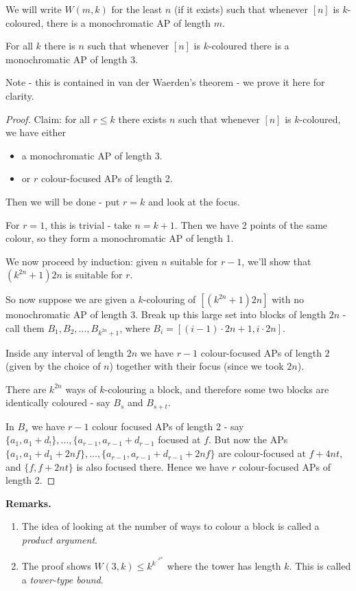 \documentclass[10pt,a4paper]{article}
\begin{document}
We will write $W(m,k)$ for the least $n$ (if it exists) such that whenever $[n]$ is $k$-coloured, there is a monochromatic AP of length $m$.
\begin{proposition}
  For all $k$ there is $n$ such that whenever $[n]$ is $k$-coloured there is a monochromatic AP of length 3.
\end{proposition}
Note - this is contained in van der Waerden's theorem - we prove it here for clarity.
\begin{proof}
  Claim: for all $r \leq k$ there exists $n$ such that whenever $[n]$ is $k$-coloured, we have either
  \begin{itemize}
    \item a monochromatic AP of length 3.
    \item or $r$ colour-focused APs of length 2.
  \end{itemize}
  Then we will be done - put $r = k$ and look at the focus.

  For $r = 1$, this is trivial - take $n=k+1$. Then we have 2 points of the same colour, so they form a monochromatic AP of length 1.

  We now proceed by induction: given $n$ suitable for $r-1$, we'll show that $(k^{2n}+1)2n$ is suitable for $r$.

  So now suppose we are given a $k$-colouring of $[(k^{2n}+1)2n]$ with no monochromatic AP of length 3. Break up this large set into blocks of length $2n$ - call them $B_1, B_2, \ldots, B_{k^{2n}+1}$, where $B_i = [(i-1)\cdot 2n+1, i\cdot 2n]$.

  Inside any interval of length $2n$ we have $r-1$ colour-focused APs of length $2$ (given by the choice of $n$) together with their focus (since we took $2n$).

  There are $k^{2n}$ ways of $k$-colouring a block, and therefore some two blocks are identically coloured - say $B_s$ and $B_{s+t}$.

  In $B_s$ we have $r-1$ colour focused APs of length 2 - say $\{a_1, a_1+d_!\}, \ldots, \{a_{r-1}, a_{r-1}+d_{r-1}$ focused at $f$. But now the APs $\{a_1, a_1+d_1+2nf\}, \ldots, \{a_{r-1}, a_{r-1}+d_{r-1}+2nf\}$ are colour-focused at $f+4nt$, and $\{f, f+2nt\}$ is also focused there. Hence we have $r$ colour-focused APs of length 2.
\end{proof}
\textbf{Remarks.}
\begin{enumerate}
  \item The idea of looking at the number of ways to colour a block is called a \emph{product argument}.
  \item The proof shows $W(3, k) \leq k^{k^{\iddots^{k^{4k}}}}$ where the tower has length $k$. This is called a \emph{tower-type bound}.
\end{enumerate}
\end{document}
